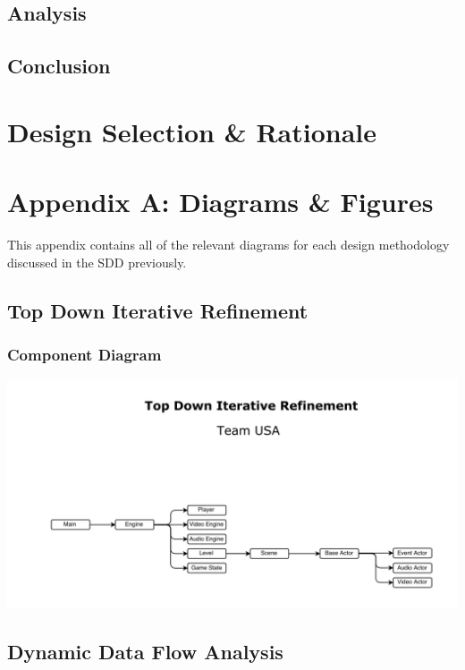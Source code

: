 \documentclass{article}
\begin{document}
	\subsection{Analysis}
	\subsection{Conclusion}
%
%
\section{Design Selection \& Rationale}
%
%
\section{Appendix A: Diagrams \& Figures}
	This appendix contains all of the relevant diagrams for each design methodology discussed in the SDD previously.
	\subsection{Top Down Iterative Refinement}
		\subsubsection{Component Diagram}
			\begin{center}
				\includegraphics[scale=0.5]{Top_down.png}
			\end{center}
	\subsection{Dynamic Data Flow Analysis}
\end{document}
